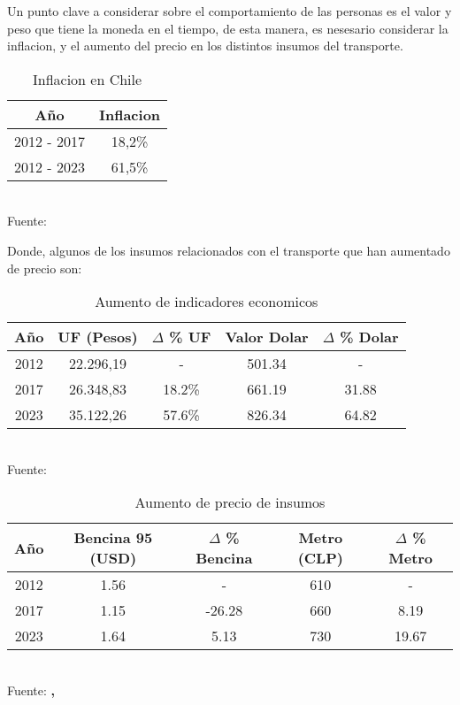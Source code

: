 \documentclass[12pt]{article} %
\begin{document}
Un punto clave a considerar sobre el comportamiento de las personas es el valor y peso que tiene la moneda en el tiempo, de esta manera, es nesesario considerar la inflacion, y el aumento del precio en los distintos insumos del transporte.

\begin{table}[H]
    \centering
    \caption{Inflacion en Chile}
    \vspace{0.2cm}
    \begin{tabular}{|c|c|}
        \hline
        Año & Inflacion \\
        \hline
        2012 - 2017 & 18,2\% \\
        2012 - 2023 & 61,5\% \\
        \hline
    \end{tabular}
    \vspace{0.2cm}
    \\Fuente: \textbf{\cite{ipc}}
\end{table}

Donde, algunos de los insumos relacionados con el transporte que han aumentado de precio son:

\begin{table}[H]
    \centering
    \caption{Aumento de indicadores economicos}
    \vspace{0.2cm}
    \begin{tabular}{|c|c|c|c|c|}
        \hline
        Año & UF (Pesos) & $\Delta$ \% UF & Valor Dolar & $\Delta$ \% Dolar\\
        \hline
        2012 & 22.296,19 & - & 501.34 & - \\
        2017 & 26.348,83 & 18.2\% & 661.19 & 31.88 \\
        2023 & 35.122,26 & 57.6\% & 826.34 & 64.82 \\
        \hline
    \end{tabular}
    \vspace{0.2cm}
    \\Fuente: \textbf{\cite{sii}}
\end{table}

\begin{table}[H]
    \centering
    \caption{Aumento de precio de insumos}
    \vspace{0.2cm}
    \begin{tabular}{|c|c|c|c|c|}
        \hline
        Año &  Bencina 95 (USD) & $\Delta$ \% Bencina & Metro (CLP) & $\Delta$ \% Metro\\
        \hline
        2012 &  1.56  & - & 610 & - \\
        2017 &  1.15 & -26.28 & 660 & 8.19\\
        2023 &  1.64 & 5.13 & 730 & 19.67\\
        \hline
    \end{tabular}
    \vspace{0.2cm}
    \\Fuente: \textbf{\cite{tradingeconomics}, \cite{bcentral}}
\end{table}
\end{document}
